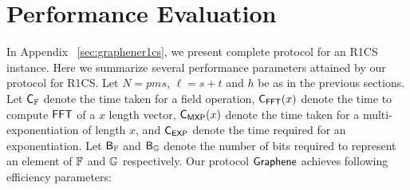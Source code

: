 \section{Performance Evaluation}\label{sec:performancecompare} 
In Appendix ~\ref{sec:graphener1cs}, we present complete protocol for an R1CS
instance. Here we summarize several performance parameters attained by our protocol for 
R1CS. Let $N= pms$, $\ell = s+t$ and $h$ be as in the previous sections. Let $\mathsf{C}_\mathbb{F}$ denote the time taken for a field operation, $\mathsf{C}_\mathsf{FFT}(x)$ denote the time to compute $\mathsf{FFT}$ of a $x$ length vector, $\mathsf{C}_\mathsf{MXP}(x)$ denote the time taken for a multi-exponentiation of length $x$, and $\mathsf{C}_\mathsf{EXP}$ denote the time required for an exponentiation. Let $\mathsf{B}_\mathbb{F}$ and $\mathsf{B}_\mathbb{G}$ denote the number of bits required to represent an element of $\mathbb{F}$ and $\mathbb{G}$ respectively. Our protocol $\textsf{Graphene}$ achieves following efficiency parameters: 


